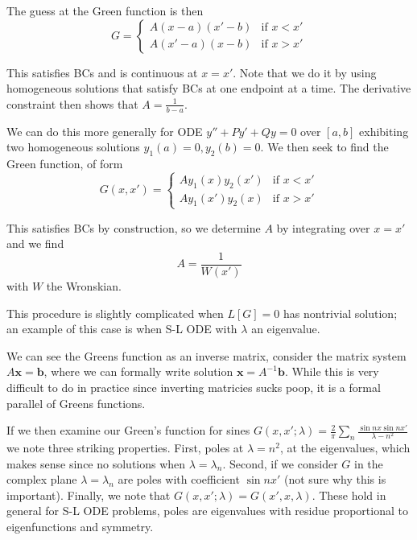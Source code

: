 \documentclass[10pt]{report}
\begin{document}
The guess at the Green function is then
\begin{equation}
    G = 
    \begin{cases}
        A(x-a)(x' - b) & \mbox{if } x < x'\\
        A(x'-a)(x - b) & \mbox{if } x > x'
    \end{cases}
\end{equation}

This satisfies BCs and is continuous at $x=x'$. Note that we do it by using homogeneous solutions that satisfy BCs at one endpoint at a time. The derivative constraint then shows that $A = \frac{1}{b-a}$.

We can do this more generally for ODE $y'' + Py' + Qy = 0$ over $[a,b]$ exhibiting two homogeneous solutions $y_1(a) = 0, y_2(b) = 0$. We then seek to find the Green function, of form
\begin{equation}
    G(x,x') =
    \begin{cases}
        Ay_1(x)y_2(x')& \mbox{if } x < x'\\
        Ay_1(x')y_2(x)& \mbox{if } x > x'
    \end{cases}
\end{equation}

This satisfies BCs by construction, so we determine $A$ by integrating over $x=x'$ and we find
\begin{equation}
    A = \frac{1}{W(x')}
\end{equation}
with $W$ the Wronskian. 

This procedure is slightly complicated when $L[G]  = 0$ has nontrivial solution; an example of this case is when S-L ODE with $\lambda$ an eigenvalue.

We can see the Greens function as an inverse matrix, consider the matrix system $A\mathbf{x} = \mathbf{b}$, where we can formally write solution $\mathbf{x} = A^{-1}\mathbf{b}$. While this is very difficult to do in practice since inverting matricies sucks poop, it is a formal parallel of Greens functions.

If we then examine our Green's function for sines $G(x,x';\lambda) = \frac{2}{\pi}\sum_{n}^{}\frac{\sin nx\sin nx'}{\lambda - n^2}$ we note three striking properties. First, poles at $\lambda = n^2$, at the eigenvalues, which makes sense since no solutions when $\lambda = \lambda_n$. Second, if we consider $G$ in the complex plane $\lambda = \lambda_n$ are poles with coefficient $\sin nx'$ (not sure why this is important). Finally, we note that $G(x,x';\lambda) = G(x', x,\lambda)$. These hold in general for S-L ODE problems, poles are eigenvalues with residue proportional to eigenfunctions and symmetry. 
\end{document}
